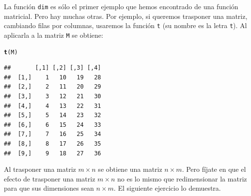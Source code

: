 \documentclass[10pt,a4paper]{article}\usepackage[]{graphicx}\usepackage[]{color}
\makeatletter
\newcommand{\hlstd}[1]{\textcolor[rgb]{0.345,0.345,0.345}{#1}}%
\newcommand{\hlkwd}[1]{\textcolor[rgb]{0.737,0.353,0.396}{\textbf{#1}}}%
\newenvironment{kframe}{%
 \def\at@end@of@kframe{}%
 \ifinner\ifhmode%
  \def\at@end@of@kframe{\end{minipage}}%
  \begin{minipage}{\columnwidth}%
 \fi\fi%
 \def\FrameCommand##1{\hskip\@totalleftmargin \hskip-\fboxsep
 \colorbox{shadecolor}{##1}\hskip-\fboxsep
     \hskip-\linewidth \hskip-\@totalleftmargin \hskip\columnwidth}%
 \MakeFramed {\advance\hsize-\width
   \@totalleftmargin\z@ \linewidth\hsize
   \@setminipage}}%
 {\par\unskip\endMakeFramed%
 \at@end@of@kframe}
\newenvironment{knitrout}{}{} %
\newcounter {cont01}
\makeatother
\begin{document}
La función {\tt dim} es sólo el primer ejemplo que hemos encontrado de una función matricial. Pero hay muchas otras. Por ejemplo, si queremos trasponer una matriz, cambiando filas por columnas, usaremos la función {\tt t} (su nombre es la letra {\tt t}). Al aplicarla a la matriz {\tt M} se obtiene:
\begin{knitrout}
\color{fgcolor}\begin{kframe}
\begin{alltt}
\hlkwd{t}\hlstd{(M)}
\end{alltt}
\begin{verbatim}
##       [,1] [,2] [,3] [,4]
##  [1,]    1   10   19   28
##  [2,]    2   11   20   29
##  [3,]    3   12   21   30
##  [4,]    4   13   22   31
##  [5,]    5   14   23   32
##  [6,]    6   15   24   33
##  [7,]    7   16   25   34
##  [8,]    8   17   26   35
##  [9,]    9   18   27   36
\end{verbatim}
\end{kframe}
\end{knitrout}
     Al trasponer una matriz $m\times n$ se obtiene una matriz $n\times m$. Pero fíjate en que el efecto de trasponer una matriz $m\times n$ no es lo mismo que redimensionar la matriz para que sus dimensiones sean $n\times m$. El siguiente ejercicio lo demuestra.
\end{document}
